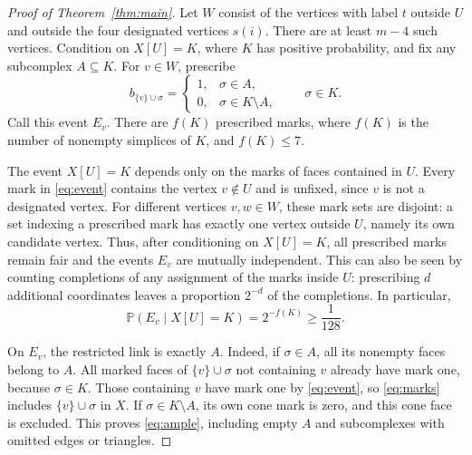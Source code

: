\documentclass[11pt,a4paper]{article}
\newcommand{\Prob}{\mathbb{P}}
\begin{document}
\begin{proof}[Proof of Theorem~\ref{thm:main}]
Let $W$ consist of the vertices with label $t$ outside $U$ and outside the
four designated vertices $s(i)$. There are at least $m-4$ such vertices.
Condition on $X[U]=K$, where $K$ has positive probability, and fix any
subcomplex $A\subseteq K$. For $v\in W$, prescribe
\begin{equation}\label{eq:event}
 b_{\{v\}\cup\sigma}=
 \begin{cases}
 1,&\sigma\in A,\\
 0,&\sigma\in K\setminus A,
 \end{cases}
 \qquad \sigma\in K.
\end{equation}
Call this event $E_v$. There are $f(K)$ prescribed marks, where $f(K)$
is the number of nonempty simplices of $K$, and $f(K)\leq7$.

The event $X[U]=K$ depends only on the marks of faces contained in $U$.
Every mark in \eqref{eq:event} contains the vertex $v\notin U$ and is
unfixed, since $v$ is not a designated vertex. For different vertices
$v,w\in W$, these mark sets are disjoint: a set indexing a prescribed
mark has exactly one vertex outside $U$, namely its own candidate vertex.
Thus, after conditioning on $X[U]=K$, all prescribed marks remain fair
and the events $E_v$ are mutually independent. This can also be seen by
counting completions of any assignment of the marks inside $U$: prescribing
$d$ additional coordinates leaves a proportion $2^{-d}$ of the completions.
In particular,
\begin{equation}\label{eq:one-witness}
 \Prob(E_v\mid X[U]=K)=2^{-f(K)}\geq\frac1{128}.
\end{equation}

On $E_v$, the restricted link is exactly $A$. Indeed, if $\sigma\in A$,
all its nonempty faces belong to $A$. All marked faces of
$\{v\}\cup\sigma$ not containing $v$ already have mark one, because
$\sigma\in K$. Those containing $v$ have mark one by \eqref{eq:event},
so \eqref{eq:marks} includes $\{v\}\cup\sigma$ in $X$. If
$\sigma\in K\setminus A$, its own cone mark is zero, and this cone face
is excluded. This proves \eqref{eq:ample}, including empty $A$ and
subcomplexes with omitted edges or triangles.


\end{proof}
\end{document}
